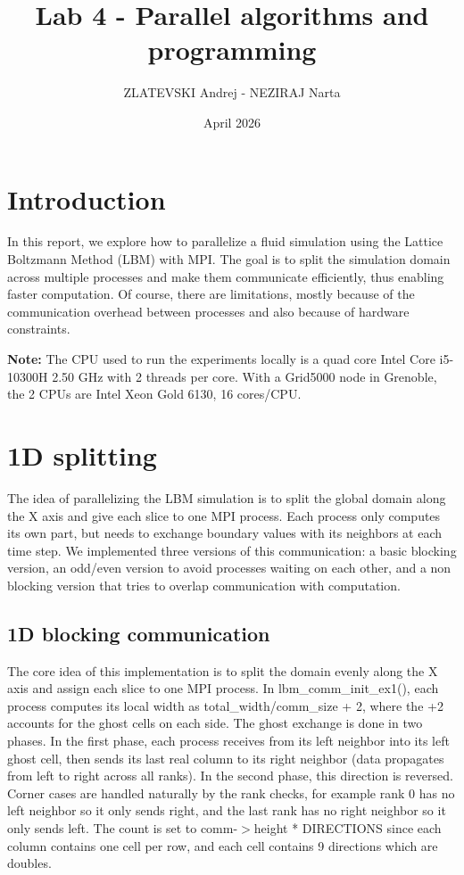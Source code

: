 \documentclass{article}
\title{Lab 4 - Parallel algorithms and programming}
\author{ZLATEVSKI Andrej - NEZIRAJ Narta}
\date{April 2026}
\begin{document}
\maketitle

\section{Introduction}

In this report, we explore how to parallelize a fluid simulation using the Lattice Boltzmann Method (LBM) with MPI. The goal is to split the simulation domain across multiple processes and make them communicate efficiently, thus enabling faster computation. Of course, there are limitations, mostly because of the communication overhead between processes and also because of hardware constraints. 

\vspace{5mm}
\textbf{Note:} The CPU used to run the experiments locally is a quad core Intel Core i5-10300H 2.50 GHz with 2 threads per core. With a Grid5000 node in Grenoble, the 2 CPUs are Intel Xeon Gold 6130, 16 cores/CPU.


\section{1D splitting }

The idea of parallelizing the LBM simulation is to split the global domain along the X axis and give each slice to one MPI process. Each process only computes its own part, but needs to exchange boundary values with its neighbors at each time step. We implemented three versions of this communication: a basic blocking version, an odd/even version to avoid processes waiting on each other, and a non blocking version that tries to overlap communication with computation.


\subsection{1D blocking communication}

The core idea of this implementation is to split the domain evenly along the X axis and assign each slice to one MPI process. In lbm\_comm\_init\_ex1(), each process computes its local width as total\_width/comm\_size + 2, where the +2 accounts for the ghost cells on each side. The ghost exchange is done in two phases. In the first phase, each process receives from its left neighbor into its left ghost cell, then sends its last real column to its right neighbor (data propagates from left to right across all ranks). In the second phase, this direction is reversed. Corner cases are handled naturally by the rank checks, for example rank 0 has no left neighbor so it only sends right, and the last rank has no right neighbor so it only sends left. The count is set to comm-$>$height * DIRECTIONS since each column contains one cell per row, and each cell contains 9 directions which are doubles.
\end{document}

